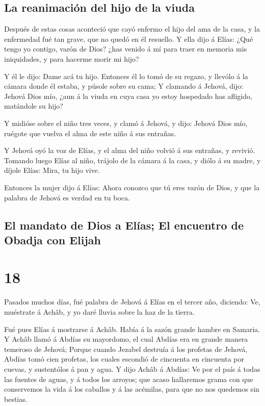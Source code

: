 \hypertarget{la-reanimaciuxf3n-del-hijo-de-la-viuda}{%
\subsection{La reanimación del hijo de la
viuda}\label{la-reanimaciuxf3n-del-hijo-de-la-viuda}}

 Después de estas cosas aconteció que cayó enfermo el hijo
del ama de la casa, y la enfermedad fué tan grave, que no quedó en él
resuello.  Y ella dijo á Elías: ¿Qué tengo yo contigo,
varón de Dios? ¿has venido á mí para traer en memoria mis iniquidades, y
para hacerme morir mi hijo?

 Y él le dijo: Dame acá tu hijo. Entonces él lo tomó de su
regazo, y llevólo á la cámara donde él estaba, y púsole sobre su cama;
 Y clamando á Jehová, dijo: Jehová Dios mío, ¿aun á la
viuda en cuya casa yo estoy hospedado has afligido, matándole su hijo?

 Y midióse sobre el niño tres veces, y clamó á Jehová, y
dijo: Jehová Dios mío, ruégote que vuelva el alma de este niño á sus
entrañas.

 Y Jehová oyó la voz de Elías, y el alma del niño volvió á
sus entrañas, y revivió.  Tomando luego Elías al niño,
trájolo de la cámara á la casa, y diólo á su madre, y díjole Elías:
Mira, tu hijo vive.

 Entonces la mujer dijo á Elías: Ahora conozco que tú eres
varón de Dios, y que la palabra de Jehová es verdad en tu boca.

\hypertarget{el-mandato-de-dios-a-eluxedas-el-encuentro-de-obadja-con-elijah}{%
\subsection{El mandato de Dios a Elías; El encuentro de Obadja con
Elijah}\label{el-mandato-de-dios-a-eluxedas-el-encuentro-de-obadja-con-elijah}}

\hypertarget{section-17}{%
\section{18}\label{section-17}}

 Pasados muchos días, fué palabra de Jehová á Elías en el
tercer año, diciendo: Ve, muéstrate á Achâb, y yo daré lluvia sobre la
haz de la tierra.

 Fué pues Elías á mostrarse á Achâb. Había á la sazón grande
hambre en Samaria.  Y Achâb llamó á Abdías su mayordomo, el
cual Abdías era en grande manera temeroso de Jehová;  Porque
cuando Jezabel destruía á los profetas de Jehová, Abdías tomó cien
profetas, los cuales escondió de cincuenta en cincuenta por cuevas, y
sustentólos á pan y agua.  Y dijo Achâb á Abdías: Ve por el
país á todas las fuentes de aguas, y á todos los arroyos; que acaso
hallaremos grama con que conservemos la vida á los caballos y á las
acémilas, para que no nos quedemos sin bestias.

